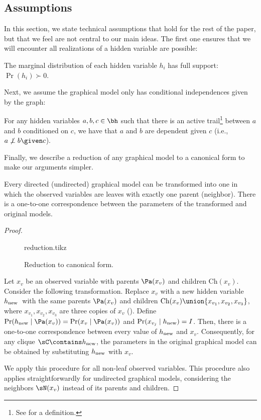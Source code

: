 \subsection{Assumptions}

In this section, we state technical assumptions that hold for the rest of the
paper, but that we feel are not central to our main ideas.
The first one ensures that we will encounter all realizations of a hidden variable are possible:

\begin{assumption}
  \label{asm:non-degeneracy}
  The marginal distribution of each hidden variable $h_i$ has full support: $\Pr(h_i) \succ 0$.
\end{assumption}

Next, we assume the graphical model only has conditional independences given by
the graph:
\begin{assumption}[Faithful]
  \label{prop:ci}  
  For any hidden variables $a,b,c \in \bh$
  such that there is an active trail\footnote{See
  \citet{koller2009probabilistic} for a definition.} between $a$ and $b$ conditioned on $c$,
  we have that $a$ and $b$ are dependent given $c$ (i.e., $a\not\perp b \given c$).
\end{assumption}

Finally, we describe a reduction of any graphical model to
  a canonical form to make our arguments simpler.
\begin{lemma}
  \label{lem:reduction}
Every directed (undirected) graphical model can be transformed into one in which
  the observed variables are leaves with exactly one parent (neighbor). 
There is a one-to-one correspondence between the parameters of the
  transformed and original models.
\end{lemma}
\begin{proof}
  \begin{figure}
    \centering
    {reduction.tikz}
    \caption{Reduction to canonical form.}
    \label{fig:reduction}
  \end{figure}

  \providecommand{\hp}{\ensuremath{h_\text{\rm new}}}
  Let $x_v$ be an observed variable with parents $\Pa(x_v)$ and children $\text{Ch}(x_v)$.
  Consider the following transformation.
  Replace $x_v$ with a new hidden variable \hp\ with the same
  parents $\Pa(x_v)$ and children $\text{Ch}(x_v) \union \{x_{v_1}, x_{v_2}, x_{v_3}\}$,
  where $x_{v_1},x_{v_2},x_{v_3}$ are three copies of $x_v$
  ().
  Define $\Pr(\hp \mid \Pa(x_v)) = \Pr(x_v \mid \Pa(x_v))$ and
  $\Pr(x_{v_j} \mid \hp) = I$.
  Then, there is a one-to-one correspondence between every value of
  $\hp$ and $x_v$. Consequently, for any clique $\sC \contains \hp$, the
  parameters in the original graphical model can be obtained by
  substituting $\hp$ with $x_v$.

  We apply this procedure for all non-leaf observed variables.
  This procedure also applies straightforwardly for undirected graphical
  models, considering the neighbors $\sN(x_v)$ instead of its parents
  and children.
\end{proof}

